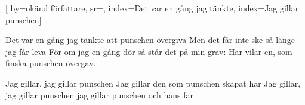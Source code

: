 

[ 		%
	by={okänd författare},					%
	sr={},					%
	index={Det var en gång jag tänkte}, %
	index={Jag gillar punschen}]						%

\beginverse*						%
Det var en gång jag tänkte
att punschen övergiva
Men det får inte ske
så länge jag får leva
För om jag en gång dör
så står det på min grav:
Här vilar en, som finska punschen övergav.
\endverse							%

\beginchorus
Jag gillar, jag gillar punschen
Jag gillar den som punschen skapat har
Jag gillar, jag gillar punschen
jag gillar punschen och hans far
\endchorus
\endsong							%